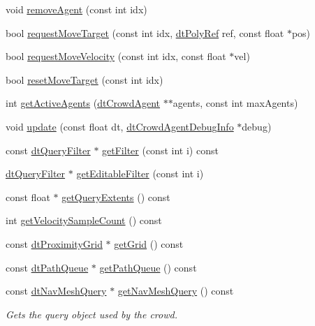 \begin{DoxyCompactItemize}
\item 
void \hyperlink{classdtCrowd_ae958ada7790a718a2887114264010f62}{remove\+Agent} (const int idx)
\item 
bool \hyperlink{classdtCrowd_aa30c34a65535118989ccd86542e96797}{request\+Move\+Target} (const int idx, \hyperlink{group__detour_gab4e0b2257a670c1a800057999612b466}{dt\+Poly\+Ref} ref, const float $\ast$pos)
\item 
bool \hyperlink{classdtCrowd_a4fe7e43e63d857e77f9db1f20b904806}{request\+Move\+Velocity} (const int idx, const float $\ast$vel)
\item 
bool \hyperlink{classdtCrowd_a81405dee71882d0a21a4defd6087a270}{reset\+Move\+Target} (const int idx)
\item 
int \hyperlink{classdtCrowd_a15a4b9b9fb72a358514489ea8f755405}{get\+Active\+Agents} (\hyperlink{structdtCrowdAgent}{dt\+Crowd\+Agent} $\ast$$\ast$agents, const int max\+Agents)
\item 
void \hyperlink{classdtCrowd_ae3f041e335ca87c323e7340e73113919}{update} (const float dt, \hyperlink{structdtCrowdAgentDebugInfo}{dt\+Crowd\+Agent\+Debug\+Info} $\ast$debug)
\item 
const \hyperlink{classdtQueryFilter}{dt\+Query\+Filter} $\ast$ \hyperlink{classdtCrowd_ae712fb6e6e907454ec0a827d11957373}{get\+Filter} (const int i) const
\item 
\hyperlink{classdtQueryFilter}{dt\+Query\+Filter} $\ast$ \hyperlink{classdtCrowd_a170a9c4cc9f88a7ee3d560abce9ad552}{get\+Editable\+Filter} (const int i)
\item 
const float $\ast$ \hyperlink{classdtCrowd_a6a37c9f57844d91e46fd4c8ef9de17b0}{get\+Query\+Extents} () const
\item 
int \hyperlink{classdtCrowd_a22ceec36962e3fdaccfbe4e84a8b24b3}{get\+Velocity\+Sample\+Count} () const
\item 
const \hyperlink{classdtProximityGrid}{dt\+Proximity\+Grid} $\ast$ \hyperlink{classdtCrowd_a1d1534a46f29afd4ab82ac37080c5ad0}{get\+Grid} () const
\item 
const \hyperlink{classdtPathQueue}{dt\+Path\+Queue} $\ast$ \hyperlink{classdtCrowd_a5300bc081c832dde048affb6bd077afb}{get\+Path\+Queue} () const
\item 
\mbox{\label{classdtCrowd_ae58e2252287003e9b7226936cf8b4ea7}} 
const \hyperlink{classdtNavMeshQuery}{dt\+Nav\+Mesh\+Query} $\ast$ \hyperlink{classdtCrowd_ae58e2252287003e9b7226936cf8b4ea7}{get\+Nav\+Mesh\+Query} () const
\begin{DoxyCompactList}\small\item\em Gets the query object used by the crowd. \end{DoxyCompactList}\item 
$$
\end{DoxyCompactItemize}
